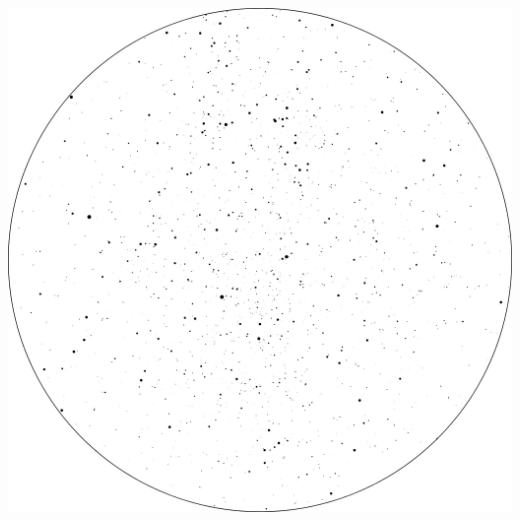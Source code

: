 \documentclass{SAS-class-skygen}
\begin{document}
	\vspace{0.5cm}
    \begin{center}
    \includegraphics[width=\textwidth]{./pics/sky_chart3.png}
    \end{center}
    
    
\end{document}
